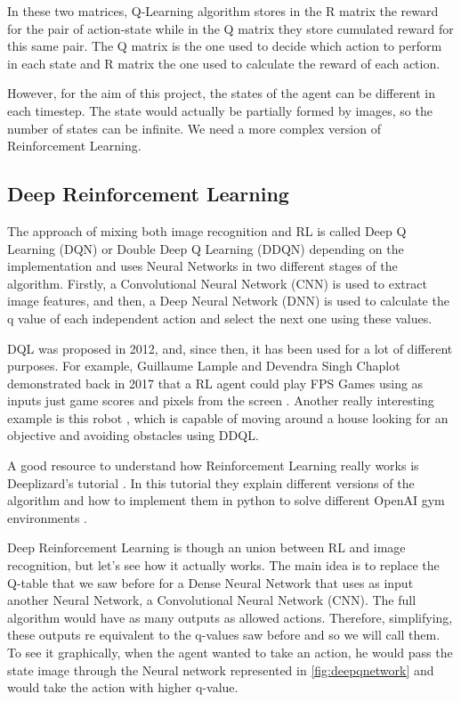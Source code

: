 			In these two matrices, Q-Learning algorithm stores in the R matrix the reward for the pair of action-state while in the Q matrix they store cumulated reward for this same pair. The Q matrix is the one used to decide which action to perform in each state and R matrix the one used to calculate the reward of each action. 
			
			However, for the aim of this project, the states of the agent can be different in each timestep. The state would actually be partially formed by images, so the number of states can be infinite. We need a more complex version of Reinforcement Learning.
			
	\subsection{Deep Reinforcement Learning}
		
		The approach of mixing both image recognition and RL is called Deep Q Learning (DQN) or Double Deep Q Learning (DDQN) depending on the implementation and uses Neural Networks in two different stages of the algorithm. Firstly, a Convolutional Neural Network (CNN) is used to extract image features, and then, a Deep Neural Network (DNN) is used to calculate the q value of each independent action and select the next one using these values.
		
		DQL was proposed in 2012, and, since then, it has been used for a lot of different purposes. For example, Guillaume Lample and Devendra Singh Chaplot demonstrated back in 2017 that a RL agent could play FPS Games using as inputs just game scores and pixels from the screen \cite{lample_playing_2018}. Another really interesting example is this robot \cite{zhu_target-driven_2017}, which is capable of moving around a house looking for an objective and avoiding obstacles using DDQL.
		
		A good resource to understand how Reinforcement Learning really works is Deeplizard's tutorial \cite{noauthor_reinforcement_nodate}. In this tutorial they explain different versions of the algorithm and how to implement them in python to solve different OpenAI gym environments \cite{openai_gym_nodate}. 
		
		Deep Reinforcement Learning is though an union between RL and image recognition, but let's see how it actually works. The main idea is to replace the Q-table that we saw before for a Dense Neural Network that uses as input another Neural Network, a Convolutional Neural Network (CNN). The full algorithm would have as many outputs as allowed actions. Therefore, simplifying, these outputs re equivalent to the q-values saw before and so we will call them. To see it graphically, when the agent wanted to take an action, he  would pass the state image through the Neural network represented in \autoref{fig:deepqnetwork} and would take the action with higher q-value.
		
